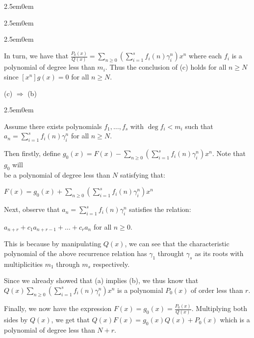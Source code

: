 \documentclass{book}
\newenvironment{myIndent}{%
   \begin{adjustwidth}{2.5em}{0em}%
}{%
   \end{adjustwidth}%
}
\newcommand{\retTwo}{\hfill\bigbreak}
\begin{document}
\begin{myIndent}
\begin{myIndent}
\begin{myIndent}
         In turn, we have that $\frac{P_0(x)}{Q(x)} = \sum\limits_{n \geq 0}\left(\sum\limits_{i=1}^s f_i(n)\gamma_i^n\right)x^n$ where each $f_i$ is a\\ [6pt] polynomial of degree less than $m_i$. Thus the conclusion of (c) holds for all $n \geq N$\\ [6pt] since $[x^n]g(x) = 0$ for all $n \geq N$.\retTwo
      \end{myIndent}

      (c) $\Longrightarrow$ (b)
      \begin{myIndent}
         Assume there exists polynomials $f_1, \ldots, f_s$ with $\deg f_i < m_i$ such that\\ $a_n = \sum\limits_{i=1}^s f_i(n)\gamma_i^n$ for all $n \geq N$.\retTwo

         Then firstly, define $g_0(x) = F(x) - \sum\limits_{n \geq 0}\left(\sum\limits_{i=1}^s f_i(n)\gamma_i^n\right)x^n$. Note that $g_0$ will\\ [1pt] be a polynomial of degree less than $N$ satisfying that:

         {\center $F(x) = g_0(x) + \sum\limits_{n \geq 0}\left(\sum\limits_{i=1}^s f_i(n)\gamma_i^n\right)x^n$ \retTwo\par}

         Next, observe that $a_n = \sum\limits_{i=1}^s f_i(n)\gamma_i^n$ satisfies the relation: 
         
         {\centering $a_{n+r} + c_1a_{n+r-1} + \ldots + c_ra_n$ for all $n \geq 0$. \retTwo\par}

         This is because by manipulating $Q(x)$, we can see that the characteristic\\ polynomial of the above recurrence relation has $\gamma_1$ throught $\gamma_s$ as its roots with multiplicities $m_1$ through $m_s$ respectively.\retTwo

         Since we already showed that (a) implies (b), we thus know that\\ $Q(x)\sum\limits_{n \geq 0}\left(\sum\limits_{i=1}^s f_i(n)\gamma_i^n\right)x^n$ is a polynomial $P_0(x)$ of order less than $r$.\retTwo

         Finally, we now have the expression $F(x) = g_0(x) = \frac{P_0(x)}{Q(x)}$. Multiplying both sides by $Q(x)$, we get that $Q(x)F(x) = g_0(x)Q(x) + P_0(x)$ which is a polynomial of degree less than $N + r$.\retTwo
      \end{myIndent}
   \end{myIndent}


\end{myIndent}
\end{document}
